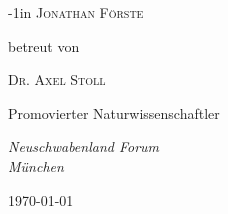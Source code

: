 \begin{titlepage}
\begin{adjustwidth*}{}{-1in}
	{\scshape\Large Jonathan Förste \\} %

	\vspace{10\baselineskip} %
	
	betreut von

	\vspace{0.3\baselineskip} %

	{\scshape\Large Dr. Axel Stoll \\}

	\vspace{0.5\baselineskip}

	Promovierter Naturwissenschaftler

	\vspace{0.5\baselineskip}

	\textit{Neuschwabenland Forum \\ München}	

	\vfill %
	
	
	
	\vspace{0.3\baselineskip} %
	
	\today%
	
\end{adjustwidth*}

\end{titlepage}


